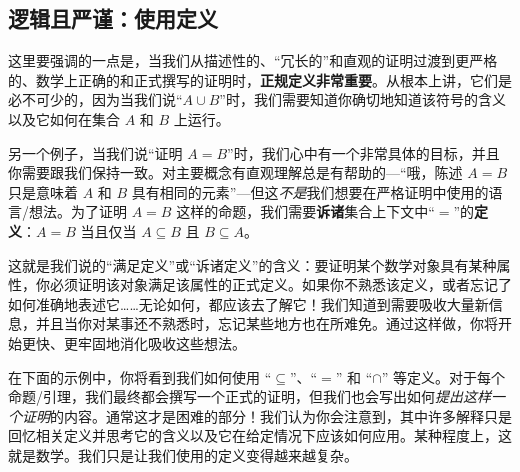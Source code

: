 \subsection{逻辑且严谨：使用定义}

这里要强调的一点是，当我们从描述性的、``冗长的''和直观的证明过渡到更严格的、数学上正确的和正式撰写的证明时，\textbf{正规定义非常重要}。从根本上讲，它们是必不可少的，因为当我们说``$A \cup B$''时，我们需要知道你确切地知道该符号的含义以及它如何在集合 $A$ 和 $B$ 上运行。

另一个例子，当我们说``证明 $A = B$''时，我们心中有一个非常具体的目标，并且你需要跟我们保持一致。对主要概念有直观理解总是有帮助的---``哦，陈述 $A = B$ 只是意味着 $A$ 和 $B$ 具有相同的元素''---但这\emph{不是}我们想要在严格证明中使用的语言/想法。为了证明 $A = B$ 这样的命题，我们需要\textbf{诉诸}集合上下文中``$=$''的\textbf{定义}：$A = B$ 当且仅当 $A \subseteq B$ 且 $B \subseteq A$。

这就是我们说的``满足定义''或``诉诸定义''的含义：要证明某个数学对象具有某种属性，你必须证明该对象满足该属性的正式定义。如果你不熟悉该定义，或者忘记了如何准确地表述它……无论如何，都应该去了解它！我们知道到需要吸收大量新信息，并且当你对某事还不熟悉时，忘记某些地方也在所难免。通过这样做，你将开始更快、更牢固地消化吸收这些想法。

在下面的示例中，你将看到我们如何使用 ``$\subseteq$''、``$=$'' 和 ``$\cap$'' 等定义。对于每个命题/引理，我们最终都会撰写一个正式的证明，但我们也会写出如何\emph{提出这样一个证明}的内容。通常这才是困难的部分！我们认为你会注意到，其中许多解释只是回忆相关定义并思考它的含义以及它在给定情况下应该如何应用。某种程度上，这就是数学。我们只是让我们使用的定义变得越来越复杂。
